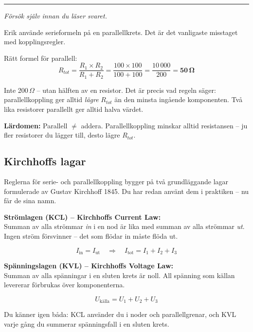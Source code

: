 \documentclass[a4paper,11pt,twoside]{book}
\newcommand{\emoji}[1]{{\emojifont #1}}
\begin{document}
\medskip
\noindent\rule{\textwidth}{0.4pt}
{\small\itshape Försök själv innan du läser svaret.}
\medskip

\begin{worked}[title={Lösning -- Fallgropsfråga 1.6.2\,F}]
Erik använde serieformeln på en parallellkrets. Det är 
det vanligaste misstaget med kopplingsregler.

Rätt formel för parallell:
\[ R_{tot} = \frac{R_1 \times R_2}{R_1 + R_2} = \frac{100 \times 100}{100 + 100} = \frac{10\,000}{200} = \mathbf{50\,\Omega} \]

Inte 200\,$\Omega$ -- utan hälften av en resistor. 
Det är precis vad regeln säger: parallellkoppling 
ger alltid \emph{lägre} $R_{tot}$ än den minsta 
ingående komponenten. Två lika resistorer parallellt 
ger alltid halva värdet.

\textbf{Lärdomen:} Parallell $\neq$ addera. 
Parallellkoppling minskar alltid resistansen -- 
ju fler resistorer du lägger till, desto lägre 
$R_{tot}$.
\end{worked}

\subsection{Kirchhoffs lagar}

Reglerna för serie- och parallellkoppling bygger på två
grundläggande lagar formulerade av Gustav Kirchhoff 1845.
Du har redan använt dem i praktiken -- nu får de sina namn.

\begin{bluebox}[title={\emoji{📐} Kirchhoffs lagar}]
\textbf{Strömlagen (KCL) -- Kirchhoffs Current Law:}\\
Summan av alla strömmar \emph{in} i en nod är lika
med summan av alla strömmar \emph{ut}. Ingen ström
försvinner -- det som flödar in måste flöda ut.

\[ I_{\text{in}} = I_{\text{ut}} \quad \Rightarrow \quad I_{\text{tot}} = I_1 + I_2 + I_3 \]

\medskip
\textbf{Spänningslagen (KVL) -- Kirchhoffs Voltage Law:}\\
Summan av alla spänningar i en sluten krets är noll.
All spänning som källan levererar förbrukas över
komponenterna.

\[ U_{\text{källa}} = U_1 + U_2 + U_3 \]
\end{bluebox}

Du känner igen båda: KCL använder du i noder och
parallellgrenar, och KVL varje gång du summerar
spänningsfall i en sluten krets.
\end{document}
